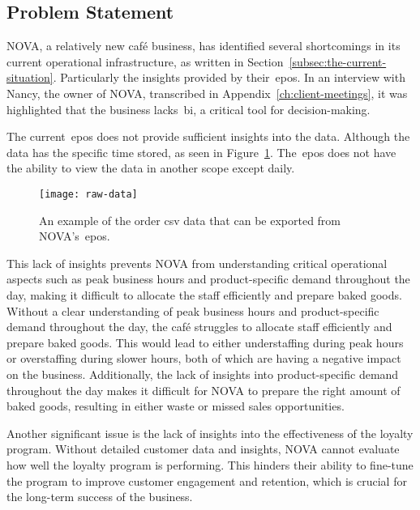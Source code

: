 \subsection{Problem Statement}\label{subsec:problem-statement}

NOVA, a relatively new café business, has identified several shortcomings in its current operational infrastructure,
as written in Section~\ref{subsec:the-current-situation}.
Particularly the insights provided by their~\acrfull{epos}.
In an interview with Nancy, the owner of NOVA, transcribed in Appendix~\ref{ch:client-meetings}, it was highlighted
that the business lacks~\acrfull{bi}, a critical tool for decision-making.

The current~\acrshort{epos} does not provide sufficient insights into the data.
Although the data has the specific time stored, as seen in Figure~\ref{fig:nova-csv-data}.
The~\acrshort{epos} does not have the ability to view the data in another scope except daily.

\begin{figure}[H]
    \centering
    \texttt{[image: raw-data]}
    \caption{An example of the order csv data that can be exported from NOVA's~\acrshort{epos}.
    }\label{fig:nova-csv-data}
\end{figure}

This lack of insights prevents NOVA from understanding critical operational aspects such as peak business hours and
product-specific demand throughout the day, making it difficult to allocate the staff efficiently and prepare baked
goods.
Without a clear understanding of peak business hours and product-specific demand throughout the day, the café struggles
to allocate staff efficiently and prepare baked goods.
This would lead to either understaffing during peak hours or overstaffing during slower hours, both of which are
having a negative impact on the business.
Additionally, the lack of insights into product-specific demand throughout the day makes it difficult for NOVA to
prepare the right amount of baked goods, resulting in either waste or missed sales opportunities.

Another significant issue is the lack of insights into the effectiveness of the loyalty program.
Without detailed customer data and insights, NOVA cannot evaluate how well the loyalty program is performing.
This hinders their ability to fine-tune the program to improve customer engagement and retention, which is crucial for
the long-term success of the business.

